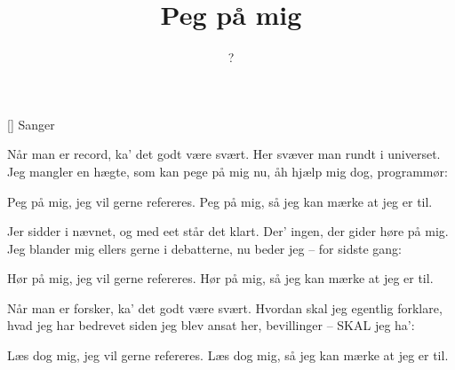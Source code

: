 \documentclass[a4paper,11pt]{article}
\title{Peg på mig}
\author{?}
\begin{document}
\maketitle

\begin{roles}
[] Sanger
\end{roles}


\begin{song}
%
Når man er record,
ka' det godt være svært.
Her svæver man rundt i universet.
Jeg mangler en hægte, som kan pege på mig nu,
åh hjælp mig dog, programmør:

Peg på mig,
jeg vil gerne refereres.
Peg på mig,
så jeg kan mærke at jeg er til.

Jer sidder i nævnet,
og med eet står det klart.
Der' ingen, der gider høre på mig.
Jeg blander mig ellers gerne i debatterne,
nu beder jeg -- for sidste gang:

Hør på mig,
jeg vil gerne refereres.
Hør på mig,
så jeg kan mærke at jeg er til.

Når man er forsker,
ka' det godt være svært.
Hvordan skal jeg egentlig forklare,
hvad jeg har bedrevet siden jeg blev ansat her,
bevillinger -- SKAL jeg ha':

Læs dog mig,
jeg vil gerne refereres.
Læs dog mig,
så jeg kan mærke at jeg er til.
\end{song}
\end{document}
